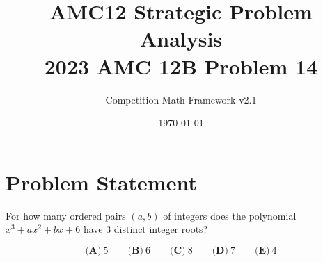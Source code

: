 \documentclass[12pt]{article}
\begin{document}
\title{AMC12 Strategic Problem Analysis\\2023 AMC 12B Problem 14}
\author{Competition Math Framework v2.1}
\date{\today}
\maketitle

\section*{Problem Statement}

For how many ordered pairs $(a,b)$ of integers does the polynomial $x^3+ax^2+bx+6$ have $3$ distinct integer roots?

$$\textbf{(A)}\ 5 \qquad\textbf{(B)}\ 6 \qquad\textbf{(C)}\ 8 \qquad\textbf{(D)}\ 7 \qquad\textbf{(E)}\ 4$$
\end{document}
